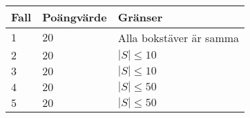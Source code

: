 \noindent
\begin{tabular}{| l | l | l |}
  \hline
  Fall & Poängvärde & Gränser \\ \hline
  $1$    & $20$    &  Alla bokstäver är samma  \\ \hline 
  $2$    & $20$    &  $|S| \leq 10$  \\ \hline 
  $3$    & $20$    &  $|S| \leq 10$  \\ \hline 
  $4$    & $20$    &  $|S| \leq 50$  \\ \hline
  $5$    & $20$    &  $|S| \leq 50$  \\ \hline
\end{tabular}
